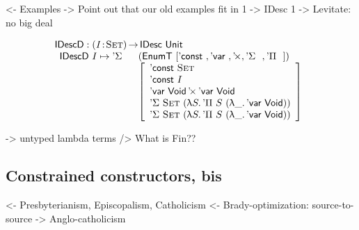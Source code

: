 \documentclass[preprint, authoryear]{sigplanconf}
\newenvironment{structure}{\footnotesize\verbatim}{\endverbatim}
\begin{document}
\begin{structure}
<- Examples
    -> Point out that our old examples fit in 1 -> IDesc 1
    -> Levitate: no big deal
\end{structure}

\[\stk{
\IDescD : \PI{\V{I}}{\Set} \IDesc{\Unit} \\
\begin{array}{ll}
\IDescD~I \mapsto \DSigma{}{} & (\EnumT [ \DConst{},
                                          \DVar{},
                                          \DProd{}{},
                                          \DSigma{}{}, 
                                          \DPi{}{} ]) \\
                              & \left[\begin{array}{l}
                                      \DConst{\Set}               \\
                                      \DConst{I}                  \\
                                      \DProd{\DVar{\Void}}{\DVar{\Void}}  \\
                                      \DSigma{\Set}{(\LAM{S} \DPi{S}{(\LAM{\_} \DVar{\Void})})} \\
                                      \DSigma{\Set}{(\LAM{S} \DPi{S}{(\LAM{\_} \DVar{\Void})})}
                                   \end{array}
                             \right]
\end{array}
}\]

\begin{structure}
    -> untyped lambda terms
        /> What is Fin??
\end{structure}

\subsection{Constrained constructors, bis}

\begin{structure}
<- Presbyterianism, Episcopalism, Catholicism
<- Brady-optimization: source-to-source
    -> Anglo-catholicism
\end{structure}


\end{document}
